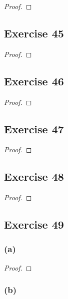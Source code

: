 \documentclass[14pt]{extarticle}
\begin{document}
\begin{proof}

\end{proof}

\subsection{Exercise 45}

\begin{proof}

\end{proof}

\subsection{Exercise 46}

\begin{proof}

\end{proof}

\subsection{Exercise 47}

\begin{proof}

\end{proof}

\subsection{Exercise 48}

\begin{proof}

\end{proof}

\subsection{Exercise 49}

\subsubsection{(a)}

\begin{proof}

\end{proof}

\subsubsection{(b)}
\end{document}
